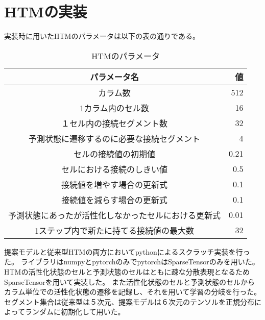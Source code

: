 \chapter{HTMの実装}
実装時に用いたHTMのパラメータは以下の表の通りである。

\begin{table}[hbtp]
  \caption{HTMのパラメータ}
  \label{impl_htm_parameter}
  \centering
  \begin{tabular}{c|r}
    パラメータ名 & 値 \\
    \hline \hline
    カラム数 & 512 \\
    1カラム内のセル数 & 16 \\
    １セル内の接続セグメント数 & 32 \\
    予測状態に遷移するのに必要な接続セグメント & 4 \\
    セルの接続値の初期値 & 0.21 \\
    セルにおける接続のしきい値 & 0.5 \\
    接続値を増やす場合の更新式 & 0.1 \\
    接続値を減らす場合の更新式 & 0.1 \\
    予測状態にあったが活性化しなかったセルにおける更新式 & 0.01 \\
    1ステップ内で新たに持てる接続値の最大数 & 32 \\
    \hline
  \end{tabular}
\end{table}


提案モデルと従来型HTMの両方においてpythonによるスクラッチ実装を行った。
ライブラリはnumpyとpytorchのみでpytorchはSparseTensorのみを用いた。
HTMの活性化状態のセルと予測状態のセルはともに疎な分散表現となるためSparseTensorを用いて実装した。
また活性化状態のセルと予測状態のセルからカラム単位での活性化状態の遷移を記録し、それを用いて学習の分岐を行った。
セグメント集合は従来型は５次元、提案モデルは６次元のテンソルを正規分布によってランダムに初期化して用いた。

